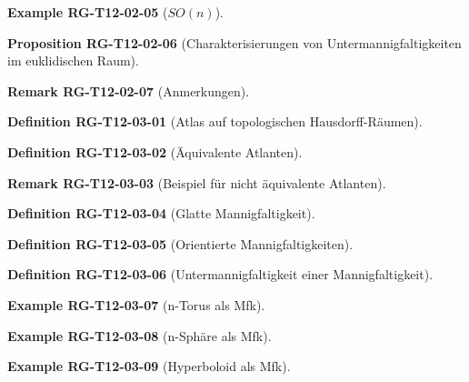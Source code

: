 \documentclass[10pt, letterpaper]{article}
\newcommand{\CustomHeading}[3]{%
  \par\medskip\noindent%
  \textbf{#1 #2} \textnormal{(#3)}.\enskip%
}
\newenvironment{DEF}[2]{\CustomHeading{Definition}{#1}{#2}}{}
\newenvironment{PROP}[2]{\CustomHeading{Proposition}{#1}{#2}}{}
\newenvironment{REM}[2]{\CustomHeading{Remark}{#1}{#2}}{}
\newenvironment{EXA}[2]{\CustomHeading{Example}{#1}{#2}}{}
\begin{document}
\begin{EXA}{RG-T12-02-05}{$SO(n)$}
\end{EXA}

\begin{PROP}{RG-T12-02-06}{Charakterisierungen von Untermannigfaltigkeiten im euklidischen Raum}
\end{PROP}

\begin{REM}{RG-T12-02-07}{Anmerkungen}
\end{REM}

\begin{DEF}{RG-T12-03-01}{Atlas auf topologischen Hausdorff-Räumen}
\end{DEF}

\begin{DEF}{RG-T12-03-02}{Äquivalente Atlanten}
\end{DEF}

\begin{REM}{RG-T12-03-03}{Beispiel für nicht äquivalente Atlanten}
\end{REM}

\begin{DEF}{RG-T12-03-04}{Glatte Mannigfaltigkeit}
\end{DEF}

\begin{DEF}{RG-T12-03-05}{Orientierte Mannigfaltigkeiten}
\end{DEF}

\begin{DEF}{RG-T12-03-06}{Untermannigfaltigkeit einer Mannigfaltigkeit}
\end{DEF}

\begin{EXA}{RG-T12-03-07}{n-Torus als Mfk}
\end{EXA}

\begin{EXA}{RG-T12-03-08}{n-Sphäre als Mfk}
\end{EXA}

\begin{EXA}{RG-T12-03-09}{Hyperboloid als Mfk}
\end{EXA}
\end{document}
